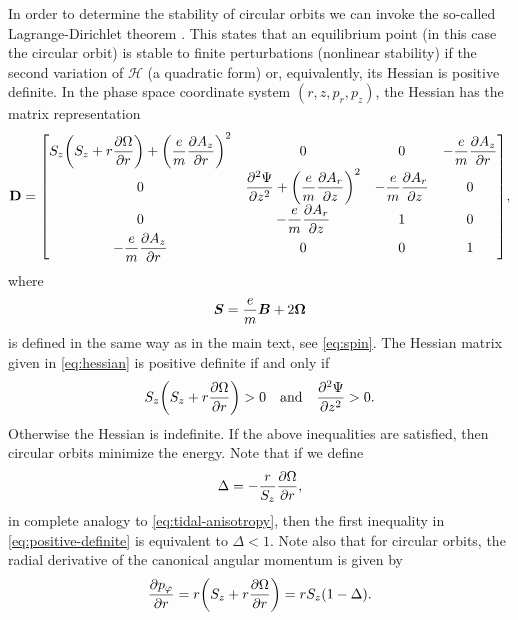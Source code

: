 \documentclass[aps,pre,notitlepage,amsmath,amssymb,amsfonts,nobibnotes,nofootinbib]{revtex4-1}
\begin{document}
In order to determine the stability of circular orbits we can invoke the
so-called Lagrange-Dirichlet theorem \citep[see e.g.][and references
therein]{Krechetnikov2007}. This states that an equilibrium point (in this
case the circular orbit) is stable to finite perturbations (nonlinear
stability) if the second variation of $\mathcal{H}$ (a quadratic form) or,
equivalently, its Hessian is positive definite. In the phase space coordinate
system $(r,z,p_r,p_z)$, the Hessian has the matrix representation
\begingroup
\renewcommand*{\arraystretch}{2.5}
\begin{equation}
  \label{eq:hessian}
  \mathbf{D} =
  \begin{bmatrix}
    \displaystyle S_z\left(S_z + r\pder{\Omega}{r}\right)
    + {\left(\cm\pder{A_z}{r}\right)}^2 & 0 & 0
    & \displaystyle -\cm\pder{A_z}{r}
    \\
    0 & \displaystyle\pdder{\Psi}{z} + {\left(\cm\pder{A_r}{z}\right)}^2
    & \displaystyle -\cm\pder{A_r}{z} & 0 \\
    0 & \displaystyle -\cm\pder{A_r}{z} & 1 & 0 \\
    \displaystyle -\cm\pder{A_z}{r} & 0 & 0 & 1
  \end{bmatrix},
\end{equation}
\endgroup
where
\begin{equation}
  \label{eq:global-spin}
  \vec{S} = \cm\vec{B} + 2\vec{\Omega}
\end{equation}
is defined in the same way as in the main text, see \cref{eq:spin}. The
Hessian matrix given in \cref{eq:hessian} is positive definite if and only if
\begin{equation}
  \label{eq:positive-definite}
  S_z\left(S_z + r\pder{\Omega}{r}\right) > 0
  \quad\textrm{and}\quad
  \pdder{\Psi}{z} > 0.
\end{equation}
Otherwise the Hessian is indefinite. If the above inequalities are satisfied,
then circular orbits minimize the energy. Note that if we define
\begin{equation}
  \label{eq:global-tidal-anisotropy}
  \Delta = -\frac{r}{S_z}\pder{\Omega}{r},
\end{equation}
in complete analogy to \cref{eq:tidal-anisotropy}, then the first inequality
in \cref{eq:positive-definite} is equivalent to $\Delta<1$. Note also that for
circular orbits, the radial derivative of the canonical angular momentum is
given by
\begin{equation}
  \label{eq:angular-momentum-gradient}
  \pder{p_\varphi}{r} = r\left(S_z + r\pder{\Omega}{r}\right) =
  rS_z(1 - \Delta).
\end{equation}
\end{document}
